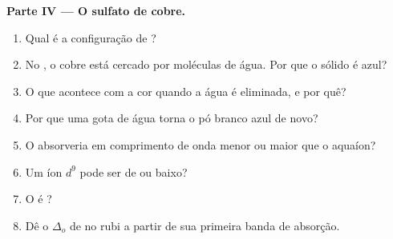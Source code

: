 \begin{problem}
\medskip
\noindent\textbf{Parte IV --- O sulfato de cobre.}
\begin{enumerate}[resume]
  \item Qual é a configuração de ?
  \item No , o cobre está cercado por moléculas de água. Por que o sólido é azul?
  \item O que acontece com a cor quando a água é eliminada, e por quê?
  \item Por que uma gota de água torna o pó branco azul de novo?
  \item O  absorveria em comprimento de onda menor ou maior que o aquaíon?
  \item Um íon $d^9$ pode ser de  ou baixo?
  \item O  é ?
  \item Dê o $\Delta_o$ de  no rubi a partir de sua primeira banda de absorção.
\end{enumerate}
\end{problem}
